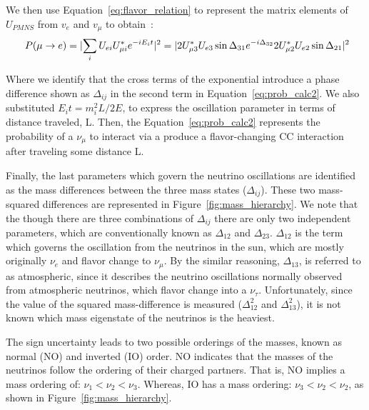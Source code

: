 We then use Equation~\ref{eq:flavor_relation} to represent the matrix elements of $U_{PMNS}$ from $v_{e}$ and $v_{\mu}$ to obtain~\citep{Nunokawa_2008}:
\begin{equation}~\label{eq:prob_calc2}
  P(\mu \rightarrow e)
  = \lvert \sum_{i} U_{e i} U^{*}_{\mu i} e^{-i E_{i}t} \rvert^{2} \\
  = \lvert 2U^{*}_{\mu 3}U_{e3}\sin \Delta_{31}e^{-i\Delta_{32}} 2U^{*}_{\mu 2}U_{e2}\sin \Delta_{21} \rvert^{2}
\end{equation}

Where we identify that the cross terms of the exponential introduce a phase difference shown as $\Delta_{ij}$ in the second term in Equation~\ref{eq:prob_calc2}.
We also substituted $E_{i}t = m^{2}_{i}L/2E$, to express the oscillation parameter in terms of distance traveled, L.
Then, the Equation~\ref{eq:prob_calc2} represents the probability of a $\nu_{\mu}$ to interact via a produce a flavor-changing CC interaction after traveling some distance L.

Finally, the last parameters which govern the neutrino oscillations are identified as the mass differences between the three mass states ($\Delta_{ij}$).
These two mass-squared differences are represented in Figure~\ref{fig:mass_hierarchy}.
We note that the though there are three combinations of $\Delta_{ij}$ there are only two independent parameters, which are conventionally known as $\Delta_{12}$ and $\Delta_{23}$.
$\Delta_{12}$ is the term which governs the oscillation from the neutrinos in the sun, which are mostly originally $\nu_{e}$ and flavor change to $\nu_{\mu}$.
By the similar reasoning, $\Delta_{13}$, is referred to as atmospheric, since it describes the neutrino oscillations normally observed from atmospheric neutrinos, which flavor change into a $\nu_{\tau}$.
Unfortunately, since the value of the squared mass-difference is measured ($\Delta_{12}^{2}$ and $\Delta_{13}^{2}$), it is not known which mass eigenstate of the neutrinos is the heaviest.

The sign uncertainty leads to two possible orderings of the masses, known as normal (NO) and inverted (IO) order.
NO indicates that the masses of the neutrinos follow the ordering of their charged partners.
That is, NO implies a mass ordering of: $\nu_{1} < \nu_{2} < \nu_{3}$.
Whereas, IO has a mass ordering: $\nu_{3} < \nu_{2} < \nu_{2}$, as shown in Figure~\ref{fig:mass_hierarchy}.

